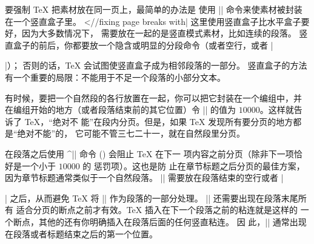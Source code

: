 要强制 \TeX{} 把素材放在同一页上，最简单的办法是
使用 |\vbox| 命令\ctsref{\vbox}来使素材被封装在一个竖直盒子里。
^^|\vbox//fixing page breaks with|
这里使用竖直盒子比水平盒子要好，因为大多数情况下，
需要放在一起的是竖直模式素材，比如连续的段落。
竖直盒子的前后，你都要放一个隐含或明显的分段命令（或者空行，或者 |\par|）；
否则的话，\TeX{} 会试图使竖直盒子成为相邻段落的一部分。
竖直盒子的方法有一个重要的局限：不能用于不足一个段落的小部分文本。



有时候，要把一个自然段的各行放置在一起，你可以把它封装在一个编组中，并
在编组开始的地方（或者段落结束前的其它位置）令 |\interlinepenalty|%
\ctsref{\interlinepenalty}的值为 $10000$。这样就告诉了 \TeX{}，“绝对不
能”在段内分页。但是，如果 \TeX{} 发现所有要分页的地方都是“绝对不能”的，
它可能不管三七二十一，就在自然段里分页。


在段落之后使用 ^|\nobreak| 命令 () 会阻止 \TeX{} 在下一
项内容之前分页（除非下一项恰好是一个小于 $10000$ 的 惩罚项）。这也是防
止在章节标题之后分页的最佳方案，因为章节标题通常类似于一个自然段落。
|\nobreak| 需要放在段落结束的空行或者 |\par| 之后，从而避免 \TeX{} 将
|\nobreak| 作为段落的一部分处理。 |\nobreak| 还需要出现在段落末尾所有
适合分页的断点之前才有效。\TeX{} 插入在下一个段落之前的粘连就是这样的
一个断点，其他的还有你明确插入在段落后面的任何竖直粘连。 因
此，|\nobreak| 通常出现在段落或者标题结束之后的第一个位置。

